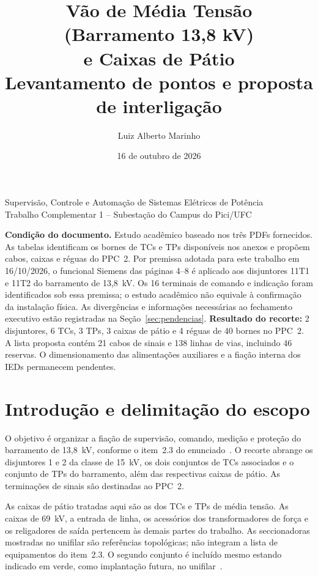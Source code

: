 \documentclass[11pt,a4paper]{article}
\title{\textbf{Vão de Média Tensão\\(Barramento 13,8 kV)\\e Caixas de Pátio}\\[6pt]
\large Levantamento de pontos e proposta de interligação}
\author{Luiz Alberto Marinho}
\date{16 de outubro de 2026}
\begin{document}
\maketitle
\begin{center}\small Supervisão, Controle e Automação de Sistemas Elétricos de Potência\\
Trabalho Complementar 1 -- Subestação do Campus do Pici/UFC\end{center}
\vspace{8mm}
\noindent\textbf{Condição do documento.} Estudo acadêmico baseado nos três PDFs fornecidos.
As tabelas identificam os bornes de TCs e TPs disponíveis nos anexos e propõem cabos,
caixas e réguas do PPC~2. Por premissa adotada para este trabalho em 16/10/2026,
o funcional Siemens das páginas 4--8 é aplicado aos disjuntores 11T1 e 11T2
do barramento de 13,8~kV. Os 16 terminais de comando e indicação foram identificados
sob essa premissa; o estudo acadêmico não equivale à confirmação da instalação física.
As divergências e informações necessárias ao
fechamento executivo estão registradas na Seção~\ref{sec:pendencias}.
\vfill
\noindent\textbf{Resultado do recorte:} 2 disjuntores, 6 TCs, 3 TPs, 3 caixas de pátio e
4 réguas de 40 bornes no PPC~2. A lista proposta contém 21 cabos de sinais e
138 linhas de vias, incluindo 46 reservas. O dimensionamento das alimentações auxiliares e a fiação interna
dos IEDs permanecem pendentes.
\newpage
\tableofcontents
\newpage

\section{Introdução e delimitação do escopo}
O objetivo é organizar a fiação de supervisão, comando, medição e proteção do
barramento de 13,8~kV, conforme o item~2.3 do enunciado~\cite{enunciado}.
O recorte abrange os disjuntores 1 e 2 da classe de 15~kV, os dois conjuntos de TCs
associados e o conjunto de TPs do barramento, além das respectivas caixas de pátio.
As terminações de sinais são destinadas ao PPC~2.

As caixas de pátio tratadas aqui são as dos TCs e TPs de média tensão. As caixas de
69~kV, a entrada de linha, os acessórios dos transformadores de força e os religadores
de saída pertencem às demais partes do trabalho. As seccionadoras mostradas no
unifilar são referências topológicas; não integram a lista de equipamentos do item~2.3.
O segundo conjunto é incluído mesmo estando indicado em verde, como implantação
futura, no unifilar~\cite{unifilar}.
\end{document}
